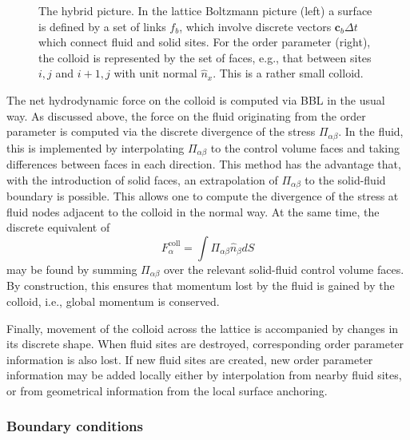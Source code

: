 \begin{figure}[h]
\begin{center}

\end{center}
\caption{The hybrid picture. In the lattice
Boltzmann picture (left) a surface is defined by a set of links
$f_b$, which involve discrete vectors $\mathbf{c}_b \Delta t$ which
connect fluid and solid sites. For the order parameter (right), the
colloid is represented by the set of faces, e.g., that between sites
$i,j$ and $i+1,j$ with unit normal $\hat{n}_x$. This is a rather small
colloid.}
\label{figure-lc-hybrid}
\end{figure}

The net hydrodynamic force on the colloid is computed via BBL
in the usual way. As discussed above, the force on the fluid
originating from the order parameter is computed via the
discrete divergence of the stress $\Pi_{\alpha\beta}$. In the
fluid, this is implemented by interpolating $\Pi_{\alpha\beta}$
to the control volume faces and taking differences between faces
in each direction. This method has the advantage that, with the
introduction of solid faces, an extrapolation of $\Pi_{\alpha\beta}$
to the solid-fluid boundary is possible. This allows one to compute
the divergence of the stress at fluid nodes adjacent to the colloid
in the normal way. At the same time, the discrete equivalent of
\begin{equation}
F_\alpha^\mathrm{coll} = \int \Pi_{\alpha\beta} \hat{n}_\beta dS
\end{equation}
may be found by summing $\Pi_{\alpha\beta}$ over the relevant solid-fluid
control volume faces. By construction, this ensures that momentum lost by
the fluid is gained by the colloid, i.e., global momentum is
conserved.

Finally, movement of the colloid across the lattice is accompanied
by changes in its discrete shape. When fluid sites are destroyed,
corresponding order parameter information is also lost. If new
fluid sites are created, new order parameter information may be
added locally either by interpolation from nearby fluid sites, or
from geometrical information from the local surface anchoring.


\subsubsection{Boundary conditions}

